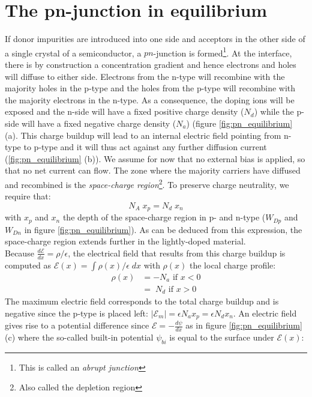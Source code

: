 \section{The pn-junction in equilibrium}
If donor impurities are introduced into one side and acceptors in the other side of a single crystal of a semiconductor, a $pn$-junction is formed\footnote{This is called an \emph{abrupt junction}}. At the interface, there is by construction a concentration gradient and hence electrons and holes will diffuse to either side. Electrons from the n-type will recombine with the majority holes in the p-type and the holes from the p-type will recombine with the majority electrons in the n-type. As a consequence, the doping ions will be exposed and the n-side will have a fixed positive charge density ($N_d$) while the p-side will have a fixed negative charge density ($N_a$) (figure \ref{fig:pn_equilibrium} (a). This charge buildup will lead to an internal electric field pointing from n-type to p-type and it will thus act against any further diffusion current (\ref{fig:pn_equilibrium} (b)). We assume for now that no external bias is applied, so that no net current can flow. The zone where the majority carriers have diffused and recombined is the \emph{space-charge region}\footnote{Also called the depletion region}. To preserve charge neutrality, we require that:
$$
N_A \; x_p = N_d \; x_n
$$
with $x_p$ and $x_n$ the depth of the space-charge region in p- and n-type ($W_{Dp}$ and $W_{Dn}$ in figure \ref{fig:pn_equilibrium}). As can be deduced from this expression, the space-charge region extends further in the lightly-doped material.\\
Because $\frac{d\mathcal{E}}{dx} = \rho/\epsilon$, the electrical field that results from this charge buildup is computed as $\mathcal{E}(x) = \int \rho(x)/\epsilon \; dx$ with $\rho(x)$ the local charge profile:
\begin{equation}
    \begin{split}
        \rho(x) &= -N_a \text{ if } x < 0 \\
                &= \; N_d \text{ if } x > 0
    \end{split}
\end{equation}
The maximum electric field corresponds to the total charge buildup and is negative since the p-type is placed left: $|\mathcal{E}_m| = \epsilon N_a x_p =  \epsilon N_d x_n$. An electric field gives rise to a potential difference since $\mathcal{E} = -\frac{d\psi}{dx}$ as in figure \ref{fig:pn_equilibrium}(c) where the so-called built-in potential $\psi_{bi}$ is equal to the surface under $\mathcal{E}(x)$:
